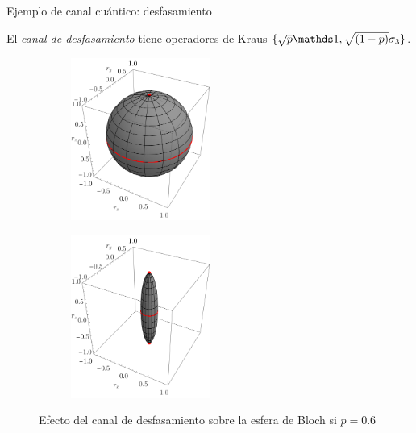 \begin{frame}{Ejemplo de canal cuántico: desfasamiento}
    \begin{center}
        El \textit{canal de desfasamiento} tiene operadores de Kraus $\{\sqrt{p}\Id,\sqrt{(1-p)}\pauli{3}\}$.
    \end{center}
    \begin{figure}
        \centering
        \begin{subfigure}{0.45\textwidth}
            \centering
            \includegraphics[width=0.5\textwidth]{figures/whole_sphere.png}
        \end{subfigure}
        \begin{subfigure}{0.45\textwidth}
            \centering
            \includegraphics[width=0.5\textwidth]{figures/dephased.png}
        \end{subfigure}
        \caption{Efecto del canal de desfasamiento sobre la esfera de Bloch si $p=0.6$}
    \end{figure}
\end{frame}
